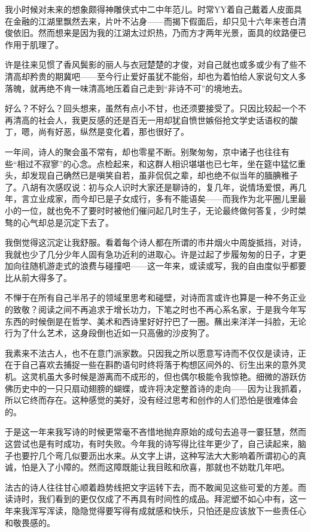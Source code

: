 \documentclass[11pt]{article}
\begin{document}
我小时候对未来的想象颇得神雕侠式中二中年范儿。时常YY着自己戴着人皮面具在金融的江湖里飘然去来，片叶不沾身——而揭下假面后，却只见十六年来苍白清俊依旧。然而想来是因为我的江湖太过炽热，乃而方才两年光景，面具的纹路便已作用于肌理了。

许是往来见惯了香风鬓影的丽人与衣冠楚楚的才俊，对自己就也或多或少有了些不清高却矜贵的期冀吧——至今行止爱好虽犹不能俗，却也为着怕给人家说句文人多落魄，就再绝不肯一味清高地压着自己走到“非诗不可”的境地去。

好么？不好么？回头想来，虽然有点小不甘，也还须要接受了。只因比较起一个不再清高的社会人，我更反感的还是百无一用却犹自愤世嫉俗抢文学史话语权的酸丁，嗯，尚有好恶，纵然是变化着，那也很好了。



一年间，诗人的聚会虽不常有，却也零星不断。别聚匆匆，京中诸子也往往有些“相过不寂寥”的心念。点检起来，和这群人相识堪堪也已七年，坐在筵中猛忆重头，却发现自己确然已是嗔笑自若，虽非侃侃之辈，却也绝不似当年的腼腆稚子了。八胡有次感叹说：初与众人识时大家还是聊诗的，复几年，说情场爱恨，再几年，言立业成家，而今却已是子女成行，多有不能语矣——而我作为北平圈儿里最小的一位，就也免不了要时时被他们催问起几时生子，无论最终做何答复，少时桀骜的心气却总是沉定下去了。

我倒觉得这沉定让我舒服。看着每个诗人都在所谓的市井烟火中周旋抵挡，对诗，我就也少了几分少年人固有急功近利的进取心。许是过起了步履匆匆的日子，才更加向往随机游走式的浪费与碰撞吧——这一年来，或读或写，我的自由度似乎都要比从前大得多了。

不惮于在所有自己半吊子的领域里思考和碰壁，对诗而言或许也算是一种不务正业的致敬？阅读之间不再追求于增长功力，下笔之时也不再心系名家，于是我今年写东西的时候倒是在哲学、美术和西诗里好好拧巴了一圈。蘸出来洋洋一抖脸，无论行为了什么艺术，这身段倒也近如一只高傲的沙皮狗了。

我素来不法古人，也不在意门派家数。只因我之所以愿意写诗而不仅仅是读诗，正在于自己喜欢去捕捉一些在斟酌语句时终将落于构想区间外的、衍生出来的意外灵机。这灵机虽大多时候是游离而不成形的，但也偶尔极能令我惊艳。细微的游跃仿佛历史中的一只只扇动翅膀的蝴蝶，或许将决定整首诗的走向——因为让我抓着，所以它终而存在。这种感觉的美好，没有经过思考和创作的人们恐怕是很难体会的。

于是这一年来我写诗的时候更常毫不吝惜地抛弃原始的成句去追寻一霎狂慧，然而这尝试也是有时成功，有时失败。今年我的诗写得比往年更少了，自己读起来，脑子也要拧几个弯几似要沥出水来。从文字上讲，这种写法大大影响着所谓初心的真诚，怕是入了小障的。然而这障既能让我目眩和欣喜，那就也不妨耽几年吧。

法古的诗人往往甘心顺着趋势线把文字运转下去，而不敢闻见这些可爱的方差。而读诗时，我们看到的更仅仅成了不再具有时间性的成品。拜泥塑不如心中有，这一年来我浑写浑读，隐隐觉得要写得有成就感和快乐，只怕还是应该放下一些责任心和敬畏感的。
\end{document}
